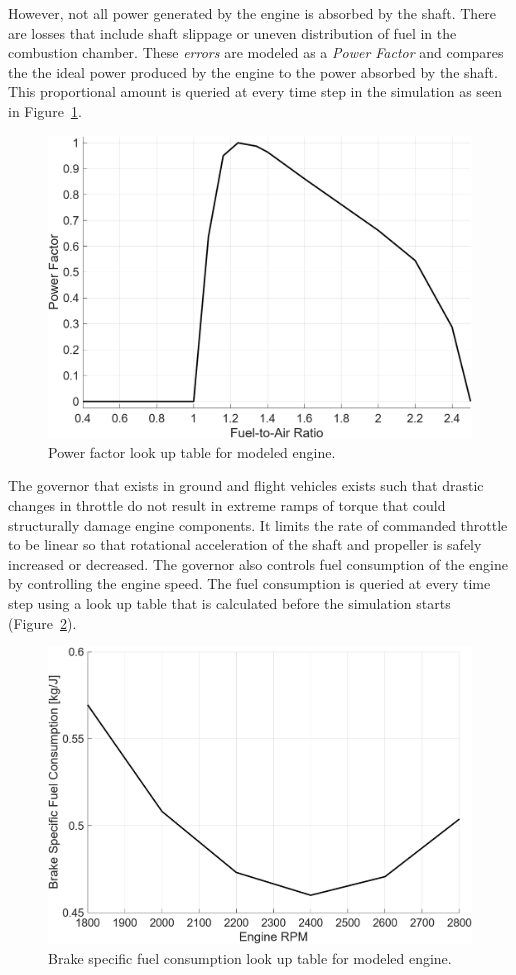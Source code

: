 However, not all power generated by the engine is absorbed by the shaft. There are losses that include shaft slippage or uneven distribution of fuel in the combustion chamber. These \textit{errors} are modeled as a \textit{Power Factor} and compares the the ideal power produced by the engine to the power absorbed by the shaft. This proportional amount is queried at every time step in the simulation as seen in Figure~\ref{fig:PFLUT}.

\begin{figure}[!ht]\label{fig:PFLUT}
    \centering
    \includegraphics[width=.75\linewidth]{Figures/PFLUT.png}
    \caption{Power factor look up table for modeled engine.}
\end{figure}

The governor that exists in ground and flight vehicles exists such that drastic changes in throttle do not result in extreme ramps of torque that could structurally damage engine components. It limits the rate of commanded throttle to be linear so that rotational acceleration of the shaft and propeller is safely increased or decreased. The governor also controls fuel consumption of the engine by controlling the engine speed. The fuel consumption is queried at every time step using a look up table that is calculated before the simulation starts (Figure~\ref{fig:BSFCLUT}).

\begin{figure}[!ht]\label{fig:BSFCLUT}
    \centering
    \includegraphics[width=.75\linewidth]{Figures/BSFCLUT.png}
    \caption{Brake specific fuel consumption look up table for modeled engine.}
\end{figure}

